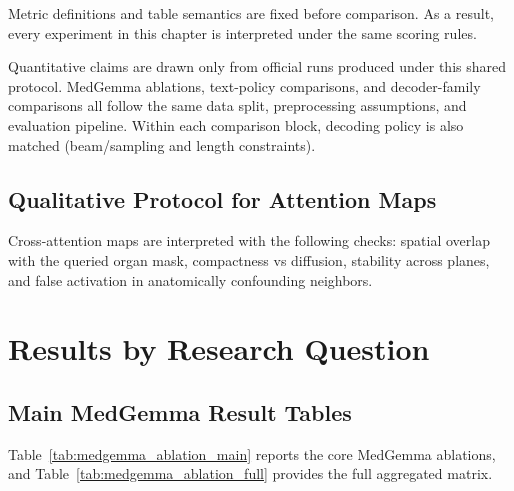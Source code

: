 Metric definitions and table semantics are fixed before comparison. As a result, every experiment in this chapter is interpreted under the same scoring rules.

Quantitative claims are drawn only from official runs produced under this shared protocol. MedGemma ablations, text-policy comparisons, and decoder-family comparisons all follow the same data split, preprocessing assumptions, and evaluation pipeline.
Within each comparison block, decoding policy is also matched (beam/sampling and length constraints).

\subsection{Qualitative Protocol for Attention Maps}
Cross-attention maps are interpreted with the following checks: spatial overlap with the queried organ mask, compactness vs diffusion, stability across planes, and false activation in anatomically confounding neighbors.

\section{Results by Research Question}\label{sec:exp_rq_results}
\subsection{Main MedGemma Result Tables}
Table~\ref{tab:medgemma_ablation_main} reports the core MedGemma ablations, and Table~\ref{tab:medgemma_ablation_full} provides the full aggregated matrix.


